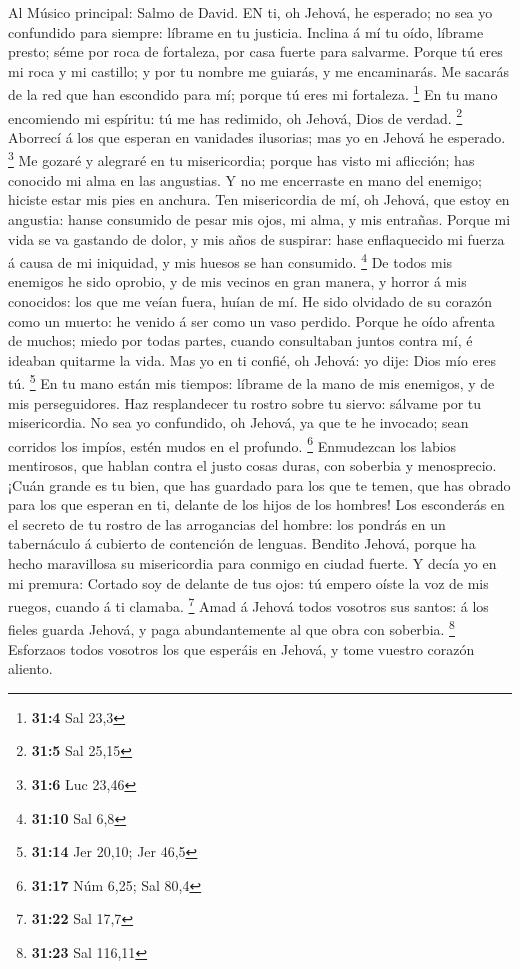  Al Músico principal: Salmo de David. EN ti, oh Jehová, he
esperado; no sea yo confundido para siempre: líbrame en tu justicia.
 Inclina á mí tu oído, líbrame presto; séme por roca de
fortaleza, por casa fuerte para salvarme.  Porque tú eres mi
roca y mi castillo; y por tu nombre me guiarás, y me encaminarás.
 Me sacarás de la red que han escondido para mí; porque tú
eres mi fortaleza. \footnote{\textbf{31:4} Sal 23,3}  En tu
mano encomiendo mi espíritu: tú me has redimido, oh Jehová, Dios de
verdad. \footnote{\textbf{31:5} Sal 25,15}  Aborrecí á los
que esperan en vanidades ilusorias; mas yo en Jehová he esperado.
\footnote{\textbf{31:6} Luc 23,46}  Me gozaré y alegraré en
tu misericordia; porque has visto mi aflicción; has conocido mi alma en
las angustias.  Y no me encerraste en mano del enemigo;
hiciste estar mis pies en anchura.  Ten misericordia de mí,
oh Jehová, que estoy en angustia: hanse consumido de pesar mis ojos, mi
alma, y mis entrañas.  Porque mi vida se va gastando de
dolor, y mis años de suspirar: hase enflaquecido mi fuerza á causa de mi
iniquidad, y mis huesos se han consumido. \footnote{\textbf{31:10} Sal
  6,8}  De todos mis enemigos he sido oprobio, y de mis
vecinos en gran manera, y horror á mis conocidos: los que me veían
fuera, huían de mí.  He sido olvidado de su corazón como un
muerto: he venido á ser como un vaso perdido.  Porque he
oído afrenta de muchos; miedo por todas partes, cuando consultaban
juntos contra mí, é ideaban quitarme la vida.  Mas yo en ti
confié, oh Jehová: yo dije: Dios mío eres tú. \footnote{\textbf{31:14}
  Jer 20,10; Jer 46,5}  En tu mano están mis tiempos:
líbrame de la mano de mis enemigos, y de mis perseguidores.
 Haz resplandecer tu rostro sobre tu siervo: sálvame por tu
misericordia.  No sea yo confundido, oh Jehová, ya que te
he invocado; sean corridos los impíos, estén mudos en el profundo.
\footnote{\textbf{31:17} Núm 6,25; Sal 80,4}  Enmudezcan
los labios mentirosos, que hablan contra el justo cosas duras, con
soberbia y menosprecio.  ¡Cuán grande es tu bien, que has
guardado para los que te temen, que has obrado para los que esperan en
ti, delante de los hijos de los hombres!  Los esconderás en
el secreto de tu rostro de las arrogancias del hombre: los pondrás en un
tabernáculo á cubierto de contención de lenguas.  Bendito
Jehová, porque ha hecho maravillosa su misericordia para conmigo en
ciudad fuerte.  Y decía yo en mi premura: Cortado soy de
delante de tus ojos: tú empero oíste la voz de mis ruegos, cuando á ti
clamaba. \footnote{\textbf{31:22} Sal 17,7}  Amad á Jehová
todos vosotros sus santos: á los fieles guarda Jehová, y paga
abundantemente al que obra con soberbia. \footnote{\textbf{31:23} Sal
  116,11}  Esforzaos todos vosotros los que esperáis en
Jehová, y tome vuestro corazón aliento.

